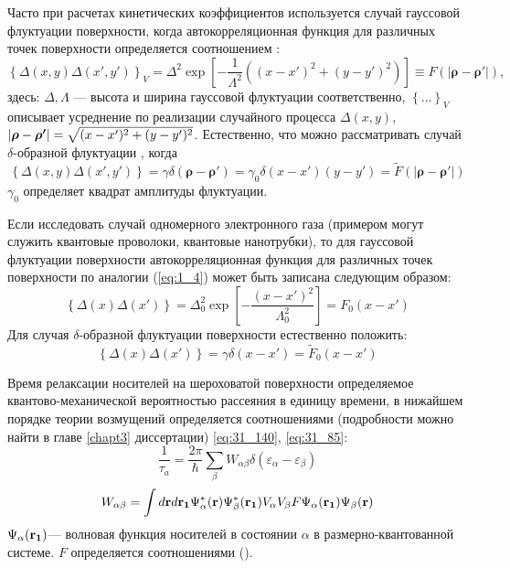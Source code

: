 Часто при расчетах кинетических коэффициентов используется случай гауссовой флуктуации поверхности, когда автокорреляционная функция для различных точек поверхности определяется соотношением \cite{Sakaki1987,Shchurova2009,Pozdnyakov2006,Khanh2016,Gold1987,Thongnum2008,Su2013}:
\begin{equation}
\label{eq:1_4}
\left\{ \Delta(x,y)\Delta(x',y') \right\}_V = \Delta^2 \exp \left[ - \frac{1}{\Lambda^2} \left( (x-x')^2 +(y-y')^2 \right) \right] \equiv F \left( \left| \boldsymbol{\rho} - \boldsymbol{\rho'} \right| \right),
\end{equation}
здесь:
$\Delta, \Lambda$ --- высота и ширина гауссовой флуктуации соответственно, 
$\left\{ ... \right\}_V$
описывает усреднение по реализации случайного процесса 
$\Delta(x,y)$, $\left| \boldsymbol{\mathbf{\rho}} - \boldsymbol{\mathbf{\rho'}} \right| = \sqrt{(x-x')^2 + (y-y')^2}$.
Естественно, что можно рассматривать случай $\delta$-образной флуктуации \cite{Lozovik1998}, когда
\begin{equation}
\label{eq:1_5}
\left\{ \Delta(x,y)\Delta(x',y') \right\} = \gamma\delta\left( \boldsymbol{\rho} - \boldsymbol{\rho'} \right) = \gamma_0\delta(x-x')(y-y')=\tilde{F} \left(\left| \boldsymbol{\rho} - \boldsymbol{\rho'} \right|\right)
\end{equation}
$\gamma_0$ определяет квадрат амплитуды флуктуации.

Если исследовать случай одномерного электронного газа (примером могут служить квантовые проволоки, квантовые нанотрубки), то для гауссовой флуктуации поверхности автокорреляционная функция для различных точек поверхности по аналогии (\ref{eq:1_4}) может быть записана следующим образом:
\begin{equation}
\label{eq:1_6}
\left\{\Delta(x)\Delta(x')\right\}=\Delta^2_0 \exp \left[-\frac{(x-x')^2}{\Lambda^2_0}\right] = F_0(x-x')
\end{equation}
Для случая $\delta$-образной флуктуации поверхности естественно положить:
\begin{equation}
\label{eq:1_7}
\left\{\Delta(x)\Delta(x')\right\}= \gamma\delta(x-x') = \tilde{F}_0(x-x')
\end{equation}

Время релаксации носителей на шероховатой поверхности определяемое квантово-механической вероятностью рассеяния в единицу времени, в нижайшем порядке теории возмущений определяется соотношениями (подробности можно найти в главе \ref{chapt3} диссертации) \eqref{eq:31_140}, \eqref{eq:31_85}:
\begin{equation} \label{eq:1_8}
\frac{1}{\tau_a}=\frac{2\pi}{\hbar} \sum_\beta{W_{\alpha\beta}\delta\left(\varepsilon_\alpha-\varepsilon_\beta\right)}
\end{equation}
\begin{equation} \label{eq:1_8_5}
W_{\alpha\beta}=\int{d\boldsymbol{\mathbf{r}} d\boldsymbol{\mathbf{r_1}} \Psi^*_\alpha(\boldsymbol{\mathbf{r}}) \Psi^*_\beta(\boldsymbol{\mathbf{r_1}}) V_\alpha V_\beta F \Psi_\alpha(\boldsymbol{\mathbf{r_1}}) \Psi_\beta(\boldsymbol{\mathbf{r}})}
\end{equation}
$\Psi_\alpha(\boldsymbol{\mathbf{r_1}})$--- волновая функция носителей в состоянии $\alpha$ в размерно-квантованной системе. $F$ определяется соотношениями ().

